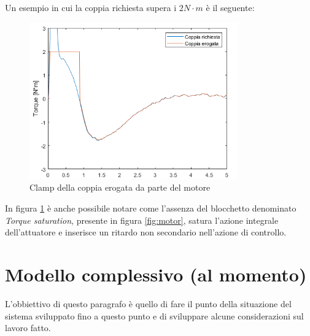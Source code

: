 Un esempio in cui la coppia richiesta supera i $2N\cdot{m}$ è il seguente:
\begin{figure}[H]
	\centering   	
	\includegraphics[width=0.8\textwidth]{Immagini/saturazione.png}
	\caption{Clamp della coppia erogata da parte del motore}
	\label{fig:clamp_motore}
\end{figure}
In figura \ref{fig:clamp_motore} è anche possibile notare come l'assenza del blocchetto denominato \textit{Torque saturation}, presente in figura \ref{fig:motor}, satura l'azione integrale dell'attuatore e inserisce un ritardo non secondario nell'azione di controllo.
\section{Modello complessivo (al momento)}
L'obbiettivo di questo paragrafo è quello di fare il punto della situazione del sistema sviluppato fino a questo punto e di sviluppare alcune considerazioni sul lavoro fatto.

